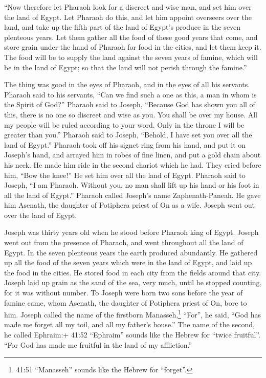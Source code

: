  ``Now therefore let Pharaoh look for a discreet and wise
man, and set him over the land of Egypt.  Let Pharaoh do
this, and let him appoint overseers over the land, and take up the fifth
part of the land of Egypt's produce in the seven plenteous years.
 Let them gather all the food of these good years that
come, and store grain under the hand of Pharaoh for food in the cities,
and let them keep it.  The food will be to supply the land
against the seven years of famine, which will be in the land of Egypt;
so that the land will not perish through the famine.''

 The thing was good in the eyes of Pharaoh, and in the eyes
of all his servants.  Pharaoh said to his servants, ``Can
we find such a one as this, a man in whom is the Spirit of God?''
 Pharaoh said to Joseph, ``Because God has shown you all of
this, there is no one so discreet and wise as you.  You
shall be over my house. All my people will be ruled according to your
word. Only in the throne I will be greater than you.'' 
Pharaoh said to Joseph, ``Behold, I have set you over all the land of
Egypt.''  Pharaoh took off his signet ring from his hand,
and put it on Joseph's hand, and arrayed him in robes of fine linen, and
put a gold chain about his neck.  He made him ride in the
second chariot which he had. They cried before him, ``Bow the knee!'' He
set him over all the land of Egypt.  Pharaoh said to
Joseph, ``I am Pharaoh. Without you, no man shall lift up his hand or
his foot in all the land of Egypt.''  Pharaoh called
Joseph's name Zaphenath-Paneah. He gave him Asenath, the daughter of
Potiphera priest of On as a wife. Joseph went out over the land of
Egypt.

 Joseph was thirty years old when he stood before Pharaoh
king of Egypt. Joseph went out from the presence of Pharaoh, and went
throughout all the land of Egypt.  In the seven plenteous
years the earth produced abundantly.  He gathered up all
the food of the seven years which were in the land of Egypt, and laid up
the food in the cities. He stored food in each city from the fields
around that city.  Joseph laid up grain as the sand of the
sea, very much, until he stopped counting, for it was without number.
 To Joseph were born two sons before the year of famine
came, whom Asenath, the daughter of Potiphera priest of On, bore to him.
 Joseph called the name of the firstborn
Manasseh,\footnote{41:51 ``Manasseh'' sounds like the Hebrew for
  ``forget''.} ``For'', he said, ``God has made me forget all my toil,
and all my father's house.''  The name of the second, he
called Ephraim:+ 41:52 ``Ephraim'' sounds like the Hebrew for ``twice
fruitful''. ``For God has made me fruitful in the land of my
affliction.''

